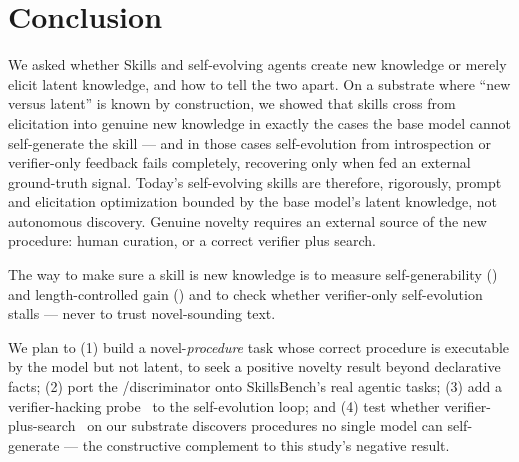 \section{Conclusion}
\label{sec:conclusion}

We asked whether Skills and self-evolving agents create new knowledge or merely elicit latent
knowledge, and how to tell the two apart. On a substrate where ``new versus latent'' is known by
construction, we showed that skills cross from elicitation into genuine new knowledge in exactly
the cases the base model cannot self-generate the skill --- and in those cases self-evolution
from introspection or verifier-only feedback fails completely, recovering only when fed an
external ground-truth signal. Today's self-evolving skills are therefore, rigorously,
prompt and elicitation optimization bounded by the base model's latent knowledge, not autonomous
discovery. Genuine novelty requires an external source of the new procedure: human curation, or
a correct verifier plus search.

 The way to make sure a skill is new knowledge is to measure
self-generability (\SG) and length-controlled gain (\LCG) and to check whether verifier-only
self-evolution stalls --- never to trust novel-sounding text.

 We plan to (1) build a novel-\emph{procedure} task whose correct procedure is
executable by the model but not latent, to seek a positive novelty result beyond declarative
facts; (2) port the \SG/\LCG discriminator onto SkillsBench's real agentic tasks; (3) add a
verifier-hacking probe~\citep{redqueen} to the self-evolution loop; and (4) test whether
verifier-plus-search~\citep{alphaevolve} on our substrate discovers procedures no single model
can self-generate --- the constructive complement to this study's negative result.
